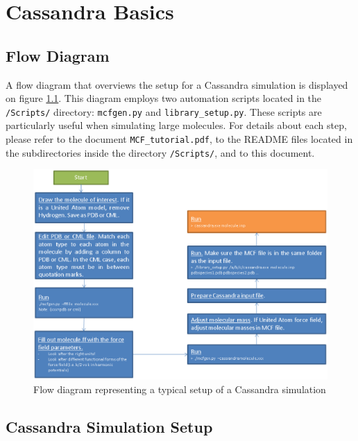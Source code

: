 %
\chapter{Cassandra Basics}
\section{Flow Diagram}
A flow diagram that overviews the setup for a Cassandra simulation is displayed on figure \ref{fig:flow_diagram}. 
This diagram employs two automation scripts located in the \texttt{/Scripts/} directory: \texttt{mcfgen.py} and \texttt{library\_setup.py}.
These scripts are particularly useful when simulating large molecules. 
For details about each step, please refer to the document \texttt{MCF\_tutorial.pdf}, to the README files located in the subdirectories inside the directory \texttt{/Scripts/}, and to this document.

\begin{figure}[t]
\includegraphics[width=\linewidth]{simulationsetup_betarelease.eps}
\caption{Flow diagram representing a typical setup of a Cassandra simulation}\label{fig:flow_diagram}
\end{figure}




\section{Cassandra Simulation Setup}

